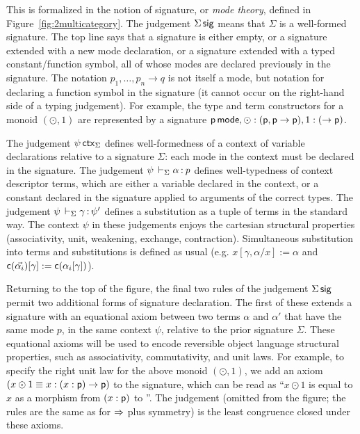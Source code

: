 This is formalized in the notion of signature, or \emph{mode theory},
defined in Figure~\ref{fig:2multicategory}.  The judgement $\Sigma \, \mathsf{sig}$ means that $\Sigma$ is a well-formed signature.  The top line
says that a signature is either empty, or a signature extended with a
new mode declaration, or a signature extended with a typed
constant/function symbol, all of whose modes are declared previously in
the signature.  The notation $p_1,\ldots,p_n \to q$ is not itself a
mode, but notation for declaring a function symbol in the signature (it
cannot occur on the right-hand side of a typing judgement).  For
example, the type and term constructors for a monoid $(\odot,1)$ are
represented by a signature $\mathsf{p} \, \mathsf{mode}, \mathsf{\odot} :
(\mathsf{p},\mathsf{p} \to \mathsf{p}), 1 : (\to \mathsf{p})$.

{
The judgement $\psi \, \mathsf{ctx}_\Sigma$ defines well-formedness of a
context of variable declarations relative to a signature $\Sigma$: each
mode in the context must be declared in the signature.}  The judgement
$\psi \,\vdash_{\Sigma} \mathit{\alpha} \, \mathit{:} \, \mathit{p}$ defines well-typedness of context
descriptor terms, which are either a variable declared in the context,
or a constant declared in the signature applied to arguments of the
correct types.  The judgement $\psi \,\vdash_{\Sigma} \mathit{\gamma} \, \mathit{:} \, \mathit{\psi'}$
defines a substitution as a tuple of terms in the standard way.  The
context $\psi$ in these judgements enjoys the cartesian structural
properties (associativity, unit, weakening, exchange, contraction).
Simultaneous substitution into terms and substitutions is defined as
usual (e.g.  $x[\gamma,\alpha/x] := \alpha$ and
$\mathsf{c}(\vec{\alpha_i})[\gamma] := \mathsf{c}(\alpha_i[\gamma])$).

Returning to the top of the figure, the final two rules of the judgement
$\Sigma \, \mathsf{sig}$ permit two additional forms of signature declaration.
The first of these extends a signature with an equational axiom between
two terms $\alpha$ and $\alpha'$ that have the same mode $p$, in the
same context $\psi$, relative to the prior signature $\Sigma$.  These
equational axioms will be used to encode reversible object language
structural properties, such as associativity, commutativity, and unit
laws.  For example, to specify the right unit law for the above monoid
$(\odot,1)$, we add an axiom $(x \odot 1 \equiv x : (x : \mathsf{p}) \to
\mathsf{p})$ to the signature, which can be read as ``$x \odot 1$ is equal
to $x$ as a morphism from $(x : \mathsf{p})$ to ''.  The judgement
 (omitted from the figure; the
rules are the same as for $\Rightarrow$ plus symmetry) is the least congruence
closed under these axioms.

